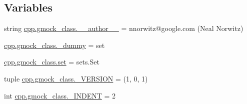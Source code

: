 \subsection*{Variables}
\begin{DoxyCompactItemize}
\item 
string \mbox{\hyperlink{namespacecpp_1_1gmock__class_a4a765064f65186f17ff74a9ebb5d27b8}{cpp.\+gmock\+\_\+class.\+\_\+\+\_\+author\+\_\+\+\_\+}} = \textquotesingle{}nnorwitz@google.\+com (Neal Norwitz)\textquotesingle{}
\item 
\mbox{\hyperlink{namespacecpp_1_1gmock__class_ab4128a969856897356b7956c5ba4fc01}{cpp.\+gmock\+\_\+class.\+\_\+dummy}} = set
\item 
\mbox{\hyperlink{namespacecpp_1_1gmock__class_a2157e96eee0b4bf9ca6d195ab76f59c2}{cpp.\+gmock\+\_\+class.\+set}} = sets.\+Set
\item 
tuple \mbox{\hyperlink{namespacecpp_1_1gmock__class_ae5d7185c5f485142460e91de1394283c}{cpp.\+gmock\+\_\+class.\+\_\+\+V\+E\+R\+S\+I\+ON}} = (1, 0, 1)
\item 
int \mbox{\hyperlink{namespacecpp_1_1gmock__class_aa09d38d618dd2e76366852c660a832e8}{cpp.\+gmock\+\_\+class.\+\_\+\+I\+N\+D\+E\+NT}} = 2
\end{DoxyCompactItemize}
